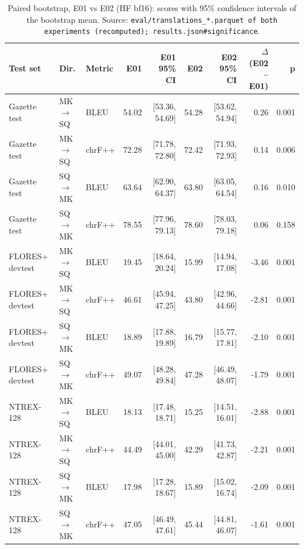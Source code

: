 \begin{table}[t]
\centering
\small
\begin{tabular}{lllrrrrrr}
\toprule
Test set & Dir. & Metric & E01 & E01 95\% CI & E02 & E02 95\% CI & $\Delta$ (E02 -- E01) & p \\
\midrule
Gazette test & MK$\rightarrow$SQ & BLEU & 54.02 & [53.36, 54.69] & 54.28 & [53.62, 54.94] & 0.26 & 0.001 \\
Gazette test & MK$\rightarrow$SQ & chrF++ & 72.28 & [71.78, 72.80] & 72.42 & [71.93, 72.93] & 0.14 & 0.006 \\
Gazette test & SQ$\rightarrow$MK & BLEU & 63.64 & [62.90, 64.37] & 63.80 & [63.05, 64.54] & 0.16 & 0.010 \\
Gazette test & SQ$\rightarrow$MK & chrF++ & 78.55 & [77.96, 79.13] & 78.60 & [78.03, 79.18] & 0.06 & 0.158 \\
FLORES+ devtest & MK$\rightarrow$SQ & BLEU & 19.45 & [18.64, 20.24] & 15.99 & [14.94, 17.08] & -3.46 & 0.001 \\
FLORES+ devtest & MK$\rightarrow$SQ & chrF++ & 46.61 & [45.94, 47.25] & 43.80 & [42.96, 44.66] & -2.81 & 0.001 \\
FLORES+ devtest & SQ$\rightarrow$MK & BLEU & 18.89 & [17.88, 19.89] & 16.79 & [15.77, 17.81] & -2.10 & 0.001 \\
FLORES+ devtest & SQ$\rightarrow$MK & chrF++ & 49.07 & [48.28, 49.84] & 47.28 & [46.49, 48.07] & -1.79 & 0.001 \\
NTREX-128 & MK$\rightarrow$SQ & BLEU & 18.13 & [17.48, 18.71] & 15.25 & [14.51, 16.01] & -2.88 & 0.001 \\
NTREX-128 & MK$\rightarrow$SQ & chrF++ & 44.49 & [44.01, 45.00] & 42.29 & [41.73, 42.87] & -2.21 & 0.001 \\
NTREX-128 & SQ$\rightarrow$MK & BLEU & 17.98 & [17.28, 18.67] & 15.89 & [15.02, 16.74] & -2.09 & 0.001 \\
NTREX-128 & SQ$\rightarrow$MK & chrF++ & 47.05 & [46.49, 47.61] & 45.44 & [44.81, 46.07] & -1.61 & 0.001 \\
\bottomrule
\end{tabular}
\caption{Paired bootstrap, E01 vs E02 (HF bf16): scores with 95\% confidence intervals of the bootstrap mean. Source: \texttt{eval/translations\_*.parquet of both experiments (recomputed); results.json\#significance}.}
\label{tab:e02-significance-e01-vs-e02}
\end{table}
